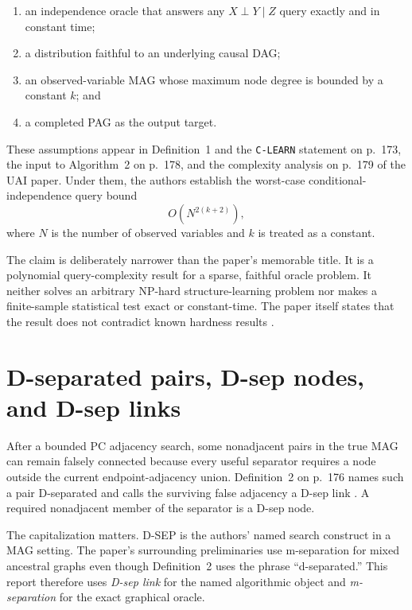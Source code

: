\documentclass[11pt,a4paper,oneside]{report}
\newcommand{\code}[1]{\texttt{#1}}
\begin{document}
\begin{enumerate}[leftmargin=2em]
  \item an independence oracle that answers any
        \(X\perp Y\mid Z\) query exactly and in constant time;
  \item a distribution faithful to an underlying causal DAG;
  \item an observed-variable MAG whose maximum node degree is bounded by a
        constant \(k\); and
  \item a completed PAG as the output target.
\end{enumerate}

These assumptions appear in Definition~1 and the \code{C-LEARN} statement on
p.~173, the input to Algorithm~2 on p.~178, and the complexity analysis on
p.~179 of the UAI paper.  Under them, the authors establish the worst-case
conditional-independence query bound
\[
  O\!\left(N^{2(k+2)}\right),
\]
where \(N\) is the number of observed variables and \(k\) is treated as a
constant.

The claim is deliberately narrower than the paper's memorable title.  It is a
polynomial query-complexity result for a sparse, faithful oracle problem.
It neither solves an arbitrary NP-hard structure-learning problem nor makes a
finite-sample statistical test exact or constant-time.  The paper itself
states that the result does not contradict known hardness results
\citep[abstract and introduction, pp.~172--173]{claassen2013learning}.

\section{D-separated pairs, D-sep nodes, and D-sep links}

After a bounded PC adjacency search, some nonadjacent pairs in the true MAG
can remain falsely connected because every useful separator requires a node
outside the current endpoint-adjacency union.  Definition~2 on p.~176 names
such a pair D-separated and calls the surviving false adjacency a D-sep link
\citep{claassen2013learning}.  A required nonadjacent member of the separator
is a D-sep node.

The capitalization matters.  D-SEP is the authors' named search construct in
a MAG setting.  The paper's surrounding preliminaries use m-separation for
mixed ancestral graphs even though Definition~2 uses the phrase
``d-separated.''  This report therefore uses \emph{D-sep link} for the named
algorithmic object and \emph{m-separation} for the exact graphical oracle.
\end{document}
